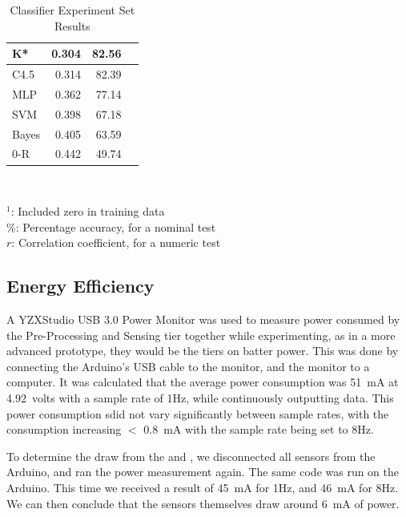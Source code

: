 \documentclass[../thesis/thesis.tex]{subfiles}
\begin{document}
\begin{table}
\begin{tabular}{|l|r|r|r|}
K*                  & 0.304         & 82.56       &              \\ \hline
C4.5                & 0.314         & 82.39       &              \\ \hline
MLP                 & 0.362         & 77.14       &              \\ \hline
SVM                 & 0.398         & 67.18       &              \\ \hline
Bayes               & 0.405         & 63.59       &              \\ \hline
0-R                 & 0.442         & 49.74       &              \\ \hline
\end{tabular}\\
\parbox{220pt}{
$^1$: Included zero in training data \\
\%: Percentage accuracy, for a nominal test \\
$r$: Correlation coefficient, for a numeric test \\
}
\caption{Classifier Experiment Set Results}
\label{tab:results:set1}
\end{table}

\subsection{Energy Efficiency}
\label{subsec:energy}

A YZXStudio USB 3.0 Power Monitor was used to measure power consumed by the Pre-Processing and Sensing tier together while experimenting, as in a more advanced prototype, they would be the tiers on batter power. This was done by connecting the Arduino's USB cable to the monitor, and the monitor to a computer. It was calculated that the average power consumption was 51~mA at 4.92~volts with a sample rate of 1Hz, while continuously outputting data. This power consumption sdid not vary significantly between sample rates, with the consumption increasing $<$ 0.8~mA with the sample rate being set to 8Hz.

To determine the draw from the \pir and \iar, we disconnected all sensors from the Arduino, and ran the power measurement again. The same code was run on the Arduino. This time we received a result of 45~mA for 1Hz, and 46~mA for 8Hz. We can then conclude that the sensors themselves draw around 6~mA of power.


\end{document}
